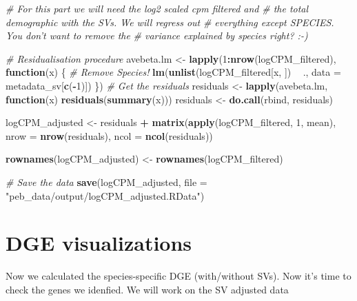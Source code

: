 \documentclass[]{book}
\newenvironment{Shaded}{\begin{snugshade}}{\end{snugshade}}
\newcommand{\CommentTok}[1]{\textcolor[rgb]{0.56,0.35,0.01}{\textit{#1}}}
\newcommand{\ControlFlowTok}[1]{\textcolor[rgb]{0.13,0.29,0.53}{\textbf{#1}}}
\newcommand{\DataTypeTok}[1]{\textcolor[rgb]{0.13,0.29,0.53}{#1}}
\newcommand{\DecValTok}[1]{\textcolor[rgb]{0.00,0.00,0.81}{#1}}
\newcommand{\KeywordTok}[1]{\textcolor[rgb]{0.13,0.29,0.53}{\textbf{#1}}}
\newcommand{\NormalTok}[1]{#1}
\newcommand{\OperatorTok}[1]{\textcolor[rgb]{0.81,0.36,0.00}{\textbf{#1}}}
\newcommand{\StringTok}[1]{\textcolor[rgb]{0.31,0.60,0.02}{#1}}
\begin{document}
\begin{Shaded}
\begin{Highlighting}[]

\CommentTok{# For this part we will need the log2 scaled cpm filtered and}
\CommentTok{# the total demographic with the SVs.  We will regress out}
\CommentTok{# everything except SPECIES.  You don't want to remove the}
\CommentTok{# variance explained by species right? :-)}

\CommentTok{# Residualisation procedure}
\NormalTok{avebeta.lm <-}\StringTok{ }\KeywordTok{lapply}\NormalTok{(}\DecValTok{1}\OperatorTok{:}\KeywordTok{nrow}\NormalTok{(logCPM_filtered), }\ControlFlowTok{function}\NormalTok{(x) \{}
  \CommentTok{# Remove Species!}
  \KeywordTok{lm}\NormalTok{(}\KeywordTok{unlist}\NormalTok{(logCPM_filtered[x, ]) }\OperatorTok{~}\StringTok{ }\NormalTok{., }\DataTypeTok{data =}\NormalTok{ metadata_sv[}\KeywordTok{c}\NormalTok{(}\OperatorTok{-}\DecValTok{1}\NormalTok{)])}
\NormalTok{\})}
\CommentTok{# Get the residuals}
\NormalTok{residuals <-}\StringTok{ }\KeywordTok{lapply}\NormalTok{(avebeta.lm, }\ControlFlowTok{function}\NormalTok{(x) }\KeywordTok{residuals}\NormalTok{(}\KeywordTok{summary}\NormalTok{(x)))}
\NormalTok{residuals <-}\StringTok{ }\KeywordTok{do.call}\NormalTok{(rbind, residuals)}

\NormalTok{logCPM_adjusted <-}\StringTok{ }\NormalTok{residuals }\OperatorTok{+}\StringTok{ }\KeywordTok{matrix}\NormalTok{(}\KeywordTok{apply}\NormalTok{(logCPM_filtered, }
  \DecValTok{1}\NormalTok{, mean), }\DataTypeTok{nrow =} \KeywordTok{nrow}\NormalTok{(residuals), }\DataTypeTok{ncol =} \KeywordTok{ncol}\NormalTok{(residuals))}

\KeywordTok{rownames}\NormalTok{(logCPM_adjusted) <-}\StringTok{ }\KeywordTok{rownames}\NormalTok{(logCPM_filtered)}

\CommentTok{# Save the data}
\KeywordTok{save}\NormalTok{(logCPM_adjusted, }\DataTypeTok{file =} \StringTok{"peb_data/output/logCPM_adjusted.RData"}\NormalTok{)}
\end{Highlighting}
\end{Shaded}

\hypertarget{dge-visualizations}{%
\section{DGE visualizations}\label{dge-visualizations}}

Now we calculated the species-specific DGE (with/without SVs).
Now it's time to check the genes we idenfied.
We will work on the SV adjusted data
\end{document}
